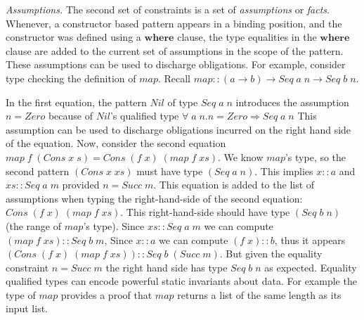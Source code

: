 \documentclass[10pt]{article}
\newcommand{\Conid}[1]{\mathit{#1}}
\newcommand{\Varid}[1]{\mathit{#1}}
\begin{document}
{\it Assumptions.} The second set of constraints is a set of
{\em assumptions} or {\em facts}. Whenever, a constructor 
based pattern appears in a binding position, and the constructor
was defined using a \ensuremath{\mathbf{where}} clause, the type equalities in
the \ensuremath{\mathbf{where}} clause are added to the current set of assumptions in the
scope of the pattern. These assumptions can be used to discharge
obligations. For example, consider type checking the definition of \ensuremath{\Varid{map}}.
Recall \ensuremath{\Varid{map}\mathbin{::}(\Varid{a}\to \Varid{b})\to \Conid{Seq}\;\Varid{a}\;\Varid{n}\to \Conid{Seq}\;\Varid{b}\;\Varid{n}}.

In the first equation, the pattern \ensuremath{\Conid{Nil}} of type \ensuremath{\Conid{Seq}\;\Varid{a}\;\Varid{n}} introduces the
assumption \ensuremath{\Varid{n}\mathrel{=}\Conid{Zero}} because of \ensuremath{\Conid{Nil}}'s qualified type \ensuremath{\forall\;\Varid{a}\;\Varid{n}. \Varid{n}\mathrel{=}\Conid{Zero}\Rightarrow \Conid{Seq}\;\Varid{a}\;\Varid{n}} This assumption can be used to discharge obligations incurred on the right
hand side of the equation.  Now, consider the second 
equation \ensuremath{\Varid{map}\;\Varid{f}\;(\Conid{Cons}\;\Varid{x}\;\Varid{s})\mathrel{=}\Conid{Cons}\;(\Varid{f}\;\Varid{x})\;(\Varid{map}\;\Varid{f}\;\Varid{xs})}. We
know \ensuremath{\Varid{map}}'s type, so the second pattern \ensuremath{(\Conid{Cons}\;\Varid{x}\;\Varid{xs})} must have type \ensuremath{(\Conid{Seq}\;\Varid{a}\;\Varid{n})}. This implies \ensuremath{\Varid{x}\mathbin{::}\Varid{a}} and \ensuremath{\Varid{xs}\mathbin{::}\Conid{Seq}\;\Varid{a}\;\Varid{m}} provided \ensuremath{\Varid{n}\mathrel{=}\Conid{Succ}\;\Varid{m}}. This
equation is added to the list of assumptions when typing the
right-hand-side of the second equation: \ensuremath{\Conid{Cons}\;(\Varid{f}\;\Varid{x})\;(\Varid{map}\;\Varid{f}\;\Varid{xs})}. This right-hand-side should have type \ensuremath{(\Conid{Seq}\;\Varid{b}\;\Varid{n})} (the range of \ensuremath{\Varid{map}}'s type). Since \ensuremath{\Varid{xs}\mathbin{::}\Conid{Seq}\;\Varid{a}\;\Varid{m}} we can compute \ensuremath{(\Varid{map}\;\Varid{f}\;\Varid{xs})\mathbin{::}\Conid{Seq}\;\Varid{b}\;\Varid{m}}, Since \ensuremath{\Varid{x}\mathbin{::}\Varid{a}} we can
compute \ensuremath{(\Varid{f}\;\Varid{x})\mathbin{::}\Varid{b}}, thus it appears \ensuremath{(\Conid{Cons}\;(\Varid{f}\;\Varid{x})\;(\Varid{map}\;\Varid{f}\;\Varid{xs}))\mathbin{::}\Conid{Seq}\;\Varid{b}\;(\Conid{Succ}\;\Varid{m})}. But given the equality constraint \ensuremath{\Varid{n}\mathrel{=}\Conid{Succ}\;\Varid{m}} the right hand side has
type \ensuremath{\Conid{Seq}\;\Varid{b}\;\Varid{n}} as expected.
Equality qualified types can encode powerful static invariants about
data. For example the type of \ensuremath{\Varid{map}} provides a proof that \ensuremath{\Varid{map}}
returns a list of the same length as its input list.
\end{document}

